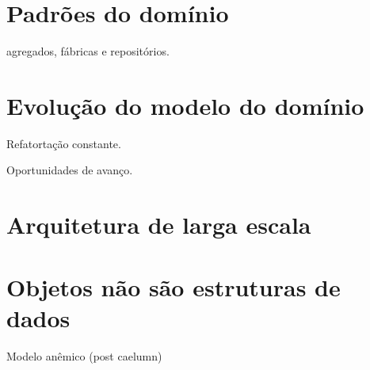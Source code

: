 \documentclass[a4paper, 12pt]{article}
\begin{document}
\section{Padrões do domínio}

agregados, fábricas e repositórios.

\section{Evolução do modelo do domínio}

Refatortação constante.

Oportunidades de avanço.

\section{Arquitetura de larga escala}

\section{Objetos não são estruturas de dados}

Modelo anêmico (post caelumn)
\end{document}
